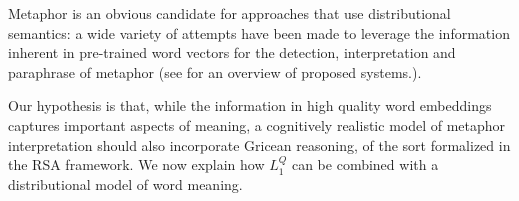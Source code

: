 \documentclass[OpenMind]{stjour}
\newcommand{\Listener}{L}
\newcommand{\QLONE}{\Listener_{{1}}^{{Q}}}
\begin{document}
		

	Metaphor is an obvious candidate for approaches that use distributional semantics: a wide variety of attempts have been made to leverage the information inherent in pre-trained word vectors for the detection, interpretation and paraphrase of metaphor (see \cite{shutova2016design} for an overview of proposed systems.).

	Our hypothesis is that, while the information in high quality word embeddings captures important aspects of meaning, a cognitively realistic model of metaphor interpretation should also incorporate Gricean reasoning, of the sort formalized in the RSA framework. We now explain how $\QLONE$ can be combined with a distributional model of word meaning.




\end{document}
